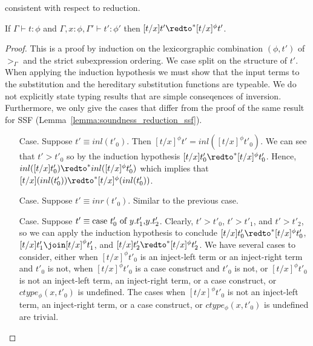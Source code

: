consistent with respect to reduction.
\begin{lemma}
  \label{lemma:soundness_reduction_ssfp}
  If $\Gamma \vdash t : \phi$ and $\Gamma, x:\phi, \Gamma' \vdash t':\phi'$ then
  $[t/x]t' \redto^* [t/x]^\phi t'$.
\end{lemma}
\begin{proof}
  This is a proof by induction on the lexicorgraphic combination
  $(\phi, t')$ of $>_\Gamma$ and the strict subexpression ordering.
  We case split on the structure of $t'$.  When applying the induction
  hypothesis we must show that the input terms to the substitution and
  the hereditary substitution functions are typeable.  We do not
  explicitly state typing results that are simple conseqences of
  inversion.  Furthermore, we only give the cases that differ from the
  proof of the same result for SSF
  (Lemma~\ref{lemma:soundness_reduction_ssf}).

  \begin{itemize}
  \item[Case.] Suppose $t' \equiv inl(t'_0)$.  Then $[t/x]^\phi t' = inl([t/x]^\phi t'_0)$.  We can
    see that $t' > t'_0$ so by the induction hypothesis $[t/x]t'_0 \redto^* [t/x]^\phi t'_0$.  Hence,
    $inl([t/x]t'_0) \redto^* inl([t/x]^\phi t'_0)$ which implies that 
    $[t/x](inl(t'_0)) \redto^* [t/x]^\phi (inl(t'_0))$.
    
  \item[Case.] Suppose $t' \equiv inr(t'_0)$.  Similar to the previous case.
    
  \item[Case.] Suppose $t' \equiv \mbox{case}\ t'_0\ \text{of}\ y\text{.}t'_1\text{,}y\text{.}t'_2$.  Clearly, $t' > t'_0$,
    $t' > t'_1$, and $t' > t'_2$, so we can apply the induction hypothesis to conclude 
    $[t/x]t'_0 \redto^* [t/x]^\phi t'_0$, $[t/x]t'_1 \join [t/x]^\phi t'_1$, and 
    $[t/x]t'_2 \redto^* [t/x]^\phi t'_2$.  We have several cases to consider, either when $[t/x]^\phi t'_0$ is an
    inject-left term or an inject-right term and $t'_0$ is not, when $[t/x]^\phi t'_0$ is a case construct
    and $t'_0$ is not, or $[t/x]^\phi t'_0$ is not an inject-left term, an inject-right term, or a case construct, or
    $ctype_\phi(x,t'_0)$ is undefined.  The cases when $[t/x]^\phi t'_0$ is not an inject-left term, an inject-right term, 
    or a case construct, or $ctype_\phi(x,t'_0)$ is undefined are trivial.
    

\end{itemize}
\end{proof}
